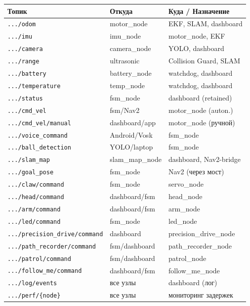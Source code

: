 \documentclass[12pt, a4paper]{article}
\begin{document}
\begin{center}
\begin{tabular}{p{6cm} p{3cm} p{4.5cm}}
\toprule
\textbf{Топик} & \textbf{Откуда} & \textbf{Куда / Назначение} \\
\midrule
\texttt{.../odom}             & motor\_node    & EKF, SLAM, dashboard \\
\texttt{.../imu}              & imu\_node      & motor\_node, EKF \\
\texttt{.../camera}           & camera\_node   & YOLO, dashboard \\
\texttt{.../range}            & ultrasonic     & Collision Guard, SLAM \\
\texttt{.../battery}          & battery\_node  & watchdog, dashboard \\
\texttt{.../temperature}      & temp\_node     & watchdog, dashboard \\
\texttt{.../status}           & fsm\_node      & dashboard (retained) \\
\texttt{.../cmd\_vel}         & fsm/Nav2       & motor\_node (auton.) \\
\texttt{.../cmd\_vel/manual}  & dashboard/app  & motor\_node (ручной) \\
\texttt{.../voice\_command}   & Android/Vosk   & fsm\_node \\
\texttt{.../ball\_detection}  & YOLO/laptop    & fsm\_node \\
\texttt{.../slam\_map}        & slam\_map\_node & dashboard, Nav2-bridge \\
\texttt{.../goal\_pose}       & fsm\_node      & Nav2 (через мост) \\
\texttt{.../claw/command}     & fsm\_node      & servo\_node \\
\texttt{.../head/command}     & dashboard/fsm  & head\_node \\
\texttt{.../arm/command}      & dashboard/fsm  & arm\_node \\
\texttt{.../led/command}      & fsm\_node      & led\_node \\
\texttt{.../precision\_drive/command} & dashboard & precision\_drive\_node \\
\texttt{.../path\_recorder/command}   & fsm/dashboard & path\_recorder\_node \\
\texttt{.../patrol/command}   & fsm/dashboard  & patrol\_node \\
\texttt{.../follow\_me/command} & dashboard/fsm & follow\_me\_node \\
\texttt{.../log/events}       & все узлы       & dashboard (лог) \\
\texttt{.../perf/\{node\}}    & все узлы       & мониторинг задержек \\
\bottomrule
\end{tabular}
\end{center}
\end{document}
